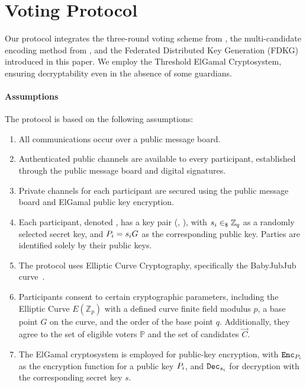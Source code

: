 \documentclass[runningheads]{llncs}
\begin{document}
\section{Voting Protocol}

Our protocol integrates the three-round voting scheme from \cite{schoenmakersLectureNotesCryptographic2018}, the multi-candidate encoding method from \cite{haoAnonymousVotingTworound2010}, and the Federated Distributed Key Generation (FDKG) introduced in this paper. We employ the Threshold ElGamal Cryptosystem, ensuring decryptability even in the absence of some guardians.

\paragraph*{Assumptions}
The protocol is based on the following assumptions:
\begin{enumerate}
\item All communications occur over a public message board.
\item Authenticated public channels are available to every participant, established through the public message board and digital signatures.
\item Private channels for each participant are secured using the public message board and ElGamal public key encryption.
\item Each participant, denoted , has a key pair (, ), with $s_{i} \in_\$ \mathbb{Z}_q$ as a randomly selected secret key, and $P_{i} = s_{i} G$ as the corresponding public key. Parties are identified solely by their public keys.
\item The protocol uses Elliptic Curve Cryptography, specifically the BabyJubJub curve~\cite{whitehatBabyJubjubElliptic2020}.
\item Participants consent to certain cryptographic parameters, including the Elliptic Curve $E(\mathbb{Z}_p)$ with a defined curve finite field modulus $p$, a base point $G$ on the curve, and the order of the base point $q$. Additionally, they agree to the set of eligible voters $\mathbb{P}$ and the set of candidates $\vec{C}$.
\item The ElGamal cryptosystem is employed for public-key encryption, with $\texttt{Enc}_{P_{i}}$ as the encryption function for a public key $P_{i}$, and $\texttt{Dec}_{s_{i}}$ for decryption with the corresponding secret key $s$.
\end{enumerate}
\end{document}
